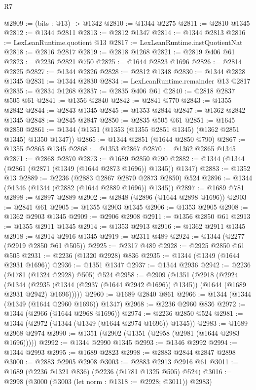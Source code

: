 \begin{lexlean}{R7}
\begin{coremodule}
@2809 := (bits : @13) -> @1342
@2810 := @1344 @2275
@2811 := @2810 @1345
@2812 := @1344 @2811
@2813 := @2812 @1347
@2814 := @1344 @2813
@2816 := LexLeanRuntime.quotient @13
@2817 := LexLeanRuntime.instQuotientNat
@2818 := @2816 @2817
@2819 := @2818 @1268
@2821 := @2819 @406 @61
@2823 := @2236 @2821 @750
@2825 := @1644 @2823 @1696
@2826 := @2814 @2825
@2827 := @1344 @2826
@2828 := @2812 @1348
@2830 := @1344 @2828 @1345
@2831 := @1344 @2830
@2834 := LexLeanRuntime.remainder @13 @2817
@2835 := @2834 @1268
@2837 := @2835 @406 @61
@2840 := @2818 @2837 @505 @61
@2841 := @1356 @2840
@2842 := @2841 @770
@2843 := @1355 @2842
@2844 := @2843 @1345
@2845 := @1353 @2844
@2847 := @1362 @2842 @1345
@2848 := @2845 @2847
@2850 := @2835 @505 @61
@2851 := @1645 @2850
@2861 := @1344 (@1351 (@1353 (@1355 @2851 @1345) (@1362 @2851 @1345) @1350 @1347))
@2865 := @1344 @2851 (@1644 @2850 @790)
@2867 := @1355 @2865 @1345
@2868 := @1353 @2867
@2870 := @1362 @2865 @1345
@2871 := @2868 @2870
@2873 := @1689 @2850 @790
@2882 := @1344 (@1344 (@2861 (@2871 (@1349 (@1644 @2873 @1696)) @1345)) @1347)
@2883 := @1352 @13
@2889 := @2236 (@2883 @2867 @2870 @2873 @2850) @524
@2896 := @1344 (@1346 (@1344 (@2882 (@1644 @2889 @1696)) @1345))
@2897 := @1689 @781
@2898 := @2897 @2889
@2902 := @2848 (@2896 (@1644 @2898 @1696))
@2903 := @2841 @61
@2905 := @1355 @2903 @1345
@2906 := @1353 @2905
@2908 := @1362 @2903 @1345
@2909 := @2906 @2908
@2911 := @1356 @2850 @61
@2913 := @1355 @2911 @1345
@2914 := @1353 @2913
@2916 := @1362 @2911 @1345
@2918 := @2914 @2916 @1345
@2919 := @2311 @489
@2924 := @1344 (@2277 (@2919 @2850 @61 @505))
@2925 := @2317 @489
@2928 := @2925 @2850 @61 @505
@2931 := @2236 (@1320 @2928) @836
@2935 := @1344 (@1349 (@1644 @2931 @1696))
@2936 := @1351 @1347
@2937 := @1344 @2936
@2942 := @2236 (@1781 (@1324 @2928) @505) @524
@2958 := @2909
    (@1351
      (@2918
        (@2924
          (@1344
            (@2935 (@1344 (@2937 (@1644 @2942 @1696)) @1345))
            (@1644 (@1689 @2931 @2942) @1696)))))
@2960 := @1689 @2840 @861
@2966 := @1344 (@1344 (@1349 (@1644 @2960 @1696)) @1347)
@2968 := @2236 @2960 @836
@2972 := @1344 (@2966 (@1644 @2968 @1696))
@2974 := @2236 @2850 @524
@2981 := @1344 (@2972 (@1344 (@1349 (@1644 @2974 @1696)) @1345))
@2983 := @1689 @2968 @2974
@2990 := @1351 (@2902 (@1351 (@2958 (@2981 (@1644 @2983 @1696)))))
@2992 := @1344 @2990 @1345
@2993 := @1346 @2992
@2994 := @1344 @2993
@2995 := @1689 @2823
@2998 := @2883 @2844 @2847 @2898
@3000 := @2883 @2905 @2908
@3003 := @2883 @2913 @2916 @61
@3011 := @1689 (@2236 @1321 @836) (@2236 (@1781 @1325 @505) @524)
@3016 := @2998 (@3000 (@3003 (let norm : @1318 := @2928; @3011)) @2983)

\end{coremodule}
\end{lexlean}
